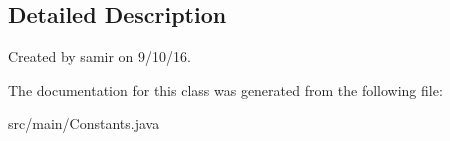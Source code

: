 \subsection{Detailed Description}
Created by samir on 9/10/16. 

The documentation for this class was generated from the following file\+:\begin{DoxyCompactItemize}
\item 
src/main/Constants.\+java\end{DoxyCompactItemize}
